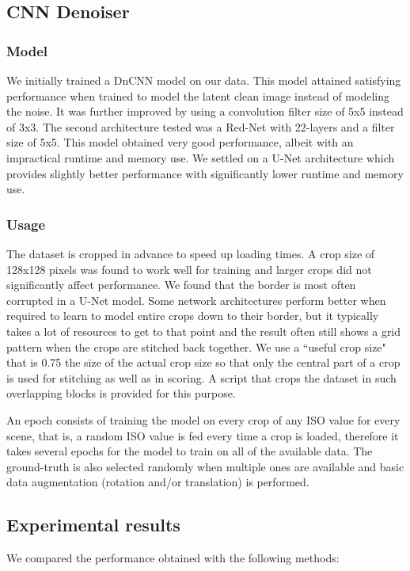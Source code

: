 \documentclass[10pt,twocolumn,letterpaper]{article}
\begin{document}
\subsection{CNN Denoiser}
\subsubsection{Model}
We initially trained a DnCNN \cite{dncnn} model on our data. This model attained satisfying performance when trained to model the latent clean image instead of modeling the noise. It was further improved by using a convolution filter size of 5x5 instead of 3x3. The second architecture tested was a Red-Net \cite{rednet} with 22-layers and a filter size of 5x5. This model obtained very good performance, albeit with an impractical runtime and memory use. We settled on a U-Net \cite{unet} architecture which provides slightly better performance with significantly lower runtime and memory use.
\subsubsection{Usage}
The dataset is cropped in advance to speed up loading times. A crop size of 128x128 pixels was found to work well for training and larger crops did not significantly affect performance. We found that the border is most often corrupted in a U-Net model. Some network architectures perform better when required to learn to model entire crops down to their border, but it typically takes a lot of resources to get to that point and the result often still shows a grid pattern when the crops are stitched back together. We use a ``useful crop size" that is 0.75 the size of the actual crop size so that only the central part of a crop is used for stitching as well as in scoring. A script that crops the dataset in such overlapping blocks is provided for this purpose.

An epoch consists of training the model on every crop of any ISO value for every scene, that is, a random ISO value is fed every time a crop is loaded, therefore it takes several epochs for the model to train on all of the available data. The ground-truth is also selected randomly when multiple ones are available and basic data augmentation (rotation and/or translation) is performed.
\subsection{Experimental results}

We compared the performance obtained with the following methods:
\end{document}
